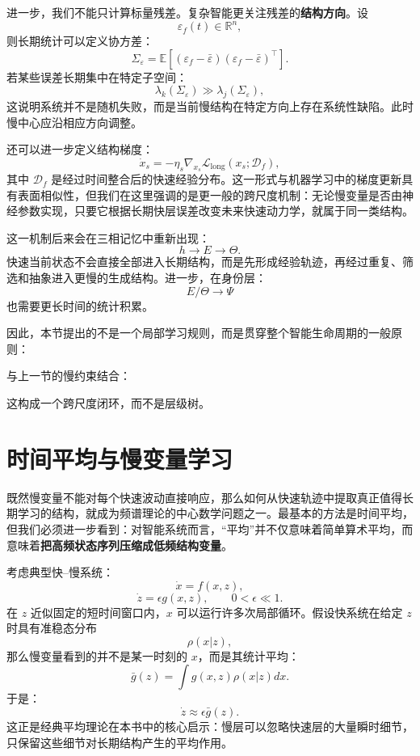 进一步，我们不能只计算标量残差。复杂智能更关注残差的\textbf{结构方向}。设
\[
\varepsilon_f(t)
\in
\mathbb{R}^n,
\]
则长期统计可以定义协方差：
\[
\Sigma_{\varepsilon}
=
\mathbb{E}
\left[
(\varepsilon_f-\bar{\varepsilon})
(\varepsilon_f-\bar{\varepsilon})^\top
\right].
\]
若某些误差长期集中在特定子空间：
\[
\lambda_k(\Sigma_\varepsilon)
\gg
\lambda_j(\Sigma_\varepsilon),
\]
这说明系统并不是随机失败，而是当前慢结构在特定方向上存在系统性缺陷。此时慢中心应沿相应方向调整。

还可以进一步定义结构梯度：
\[
\dot{x}_s
=
-\eta_s
\nabla_{x_s}
\mathcal{L}_{\mathrm{long}}
\left(
x_s;
\mathcal{D}_{f}
\right),
\]
其中 $\mathcal{D}_{f}$ 是经过时间整合后的快速经验分布。这一形式与机器学习中的梯度更新具有表面相似性，但我们在这里强调的是更一般的跨尺度机制：无论慢变量是否由神经参数实现，只要它根据长期快层误差改变未来快速动力学，就属于同一类结构。

这一机制后来会在三相记忆中重新出现：
\[
h
\rightarrow
E
\rightarrow
\Theta.
\]
快速当前状态不会直接全部进入长期结构，而是先形成经验轨迹，再经过重复、筛选和抽象进入更慢的生成结构。进一步，在身份层：
\[
E/\Theta
\rightarrow
\Psi
\]
也需要更长时间的统计积累。

因此，本节提出的不是一个局部学习规则，而是贯穿整个智能生命周期的一般原则：
\begin{statementbox}
\centering
{}
\end{statementbox}
与上一节的慢约束结合：
\begin{statementbox}
\centering
{}
\end{statementbox}
这构成一个跨尺度闭环，而不是层级树。

\section{时间平均与慢变量学习}

既然慢变量不能对每个快速波动直接响应，那么如何从快速轨迹中提取真正值得长期学习的结构，就成为频谱理论的中心数学问题之一。最基本的方法是时间平均，但我们必须进一步看到：对智能系统而言，“平均”并不仅意味着简单算术平均，而意味着\textbf{把高频状态序列压缩成低频结构变量}。

考虑典型快--慢系统：
\[
\dot{x}
=
f(x,z),
\]
\[
\dot{z}
=
\epsilon g(x,z),
\qquad
0<\epsilon\ll1.
\]
在 $z$ 近似固定的短时间窗口内，$x$ 可以运行许多次局部循环。假设快系统在给定 $z$ 时具有准稳态分布
\[
\rho(x|z),
\]
那么慢变量看到的并不是某一时刻的 $x$，而是其统计平均：
\[
\bar{g}(z)
=
\int
g(x,z)
\rho(x|z)
dx.
\]
于是：
\[
\dot{z}
\approx
\epsilon
\bar{g}(z).
\]
这正是经典平均理论在本书中的核心启示：慢层可以忽略快速层的大量瞬时细节，只保留这些细节对长期结构产生的平均作用。

